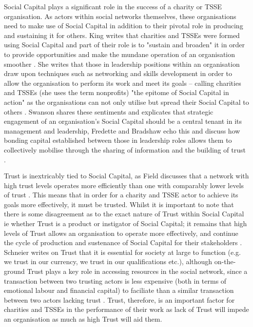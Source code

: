 Social Capital plays a significant role in the success of a charity or TSSE organisation. As actors within social networks themselves, these organisations need to make use of Social Capital in addition to their pivotal role in producing and sustaining it for others. King writes that charities and TSSEs were formed using Social Capital and part of their role is to "sustain and broaden" it in order to provide opportunities and make the mundane operation of an organisation smoother \cite{king_social_2004}. She writes that those in leadership positions within an organisation draw upon techniques such as networking and skills development in order to allow the organisation to perform its work and meet its goals -- calling charities and TSSEs (she uses the term nonprofits) "the epitome of Social Capital in action" as the organisations can not only utilise but spread their Social Capital to others \cite{king_social_2004}. Swanson shares these sentiments and explicates that strategic engagement of an organisation's Social Capital should be a central tenant in its management and leadership, Fredette and Bradshaw echo this and discuss how bonding capital established between those in leadership roles allows them to collectively mobilise through the sharing of information and the building of trust \cite{swanson_strategic_2013, fredette_social_2012}.

Trust is inextricably tied to Social Capital, as Field discusses that a network with high trust levels operates more efficiently than one with comparably lower levels of trust \cite{field_social_2003}. This means that in order for a charity and TSSE actor to achieve its goals more effectively, it must be trusted. Whilst it is important to note that there is some disagreement as to the exact nature of Trust within Social Capital ie whether Trust is a product or instigator of Social Capital; it remains that high levels of Trust allows an organisation to operate more effectively, and continue the cycle of production and sustenance of Social Capital for their stakeholders \cite{field_social_2003}. Schneier writes on Trust that it is essential for society at large to function (e.g. we trust in our currency, we trust in our qualifications etc.), although on-the-ground Trust plays a key role in accessing resources in the social network, since a transaction between two trusting actors is less expensive (both in terms of emotional labour and financial capital) to faciliate than a similar transaction between two actors lacking trust \cite{schneier_liars_2012}. Trust, therefore, is an important factor for charities and TSSEs in the performance of their work as lack of Trust will impede an organisation as much as high Trust will aid them.


